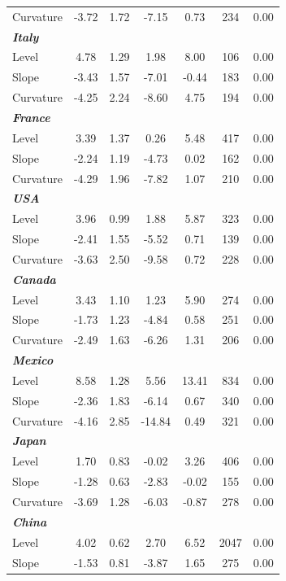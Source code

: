 \documentclass[12pt,bibliography=totoc]{article}
\begin{document}
{\begin{table}[H]
\begin{tabular}{l c c c c c c}
Curvature					&	-3.72	&	1.72	&	-7.15	&	0.73	&	234	&	0.00	\\
\textit{\textbf{Italy}}		&		&		&		&		&		&		\\
Level						&	4.78	&	1.29	&	1.98	&	8.00	&	106	&	0.00	\\
Slope				&	-3.43	&	1.57	&	-7.01	&	-0.44	&	183	&	0.00	\\
													
Curvature					&	-4.25	&	2.24	&	-8.60	&	4.75	&	194	&	0.00	\\
\textit{\textbf{France}}			&		&		&		&		&		&		\\
Level						&	3.39	&	1.37	&	0.26	&	5.48	&	417	&	0.00	\\
Slope				&	-2.24	&	1.19	&	-4.73	&	0.02	&	162	&	0.00	\\
													
Curvature					&	-4.29	&	1.96	&	-7.82	&	1.07	&	210	&	0.00	\\
\textit{\textbf{USA}}			&		&		&		&		&		&		\\
Level						&	3.96	&	0.99	&	1.88	&	5.87	&	323	&	0.00	\\
Slope				&	-2.41	&	1.55	&	-5.52	&	0.71	&	139	&	0.00	\\
													
Curvature					&	-3.63	&	2.50	&	-9.58	&	0.72	&	228	&	0.00	\\
\textit{\textbf{Canada}}				&		&		&		&		&		&		\\
Level						&	3.43	&	1.10	&	1.23	&	5.90	&	274	&	0.00	\\
Slope				&	-1.73	&	1.23	&	-4.84	&	0.58	&	251	&	0.00	\\
													
Curvature					&	-2.49	&	1.63	&	-6.26	&	1.31	&	206	&	0.00	\\
\textit{\textbf{Mexico}}			&		&		&		&		&		&		\\
Level						&	8.58	&	1.28	&	5.56	&	13.41&	834	&	0.00	\\
Slope				&	-2.36	&	1.83	&	-6.14	&	0.67	&	340	&	0.00	\\												
Curvature					&	-4.16	&	2.85&	-14.84&	0.49	&	321	&	0.00	\\
\textit{\textbf{Japan}}				&		&		&		&		&		&		\\
Level						&	1.70	&	0.83	&	-0.02	&	3.26	&	406	&	0.00	\\
Slope				&	-1.28	&	0.63	&	-2.83	&	-0.02	&	155	&	0.00	\\
													
Curvature					&	-3.69	&	1.28	&	-6.03	&	-0.87	&	278	&	0.00	\\
\textit{\textbf{China}}				&		&		&		&		&		&		\\
Level						&	4.02	&	0.62	&	2.70	&	6.52 &	2047	&	0.00	\\
Slope				&	-1.53	&	0.81	&	-3.87	&	1.65 &	275	&	0.00	\\
													

\end{tabular}
\end{table}}
\end{document}
